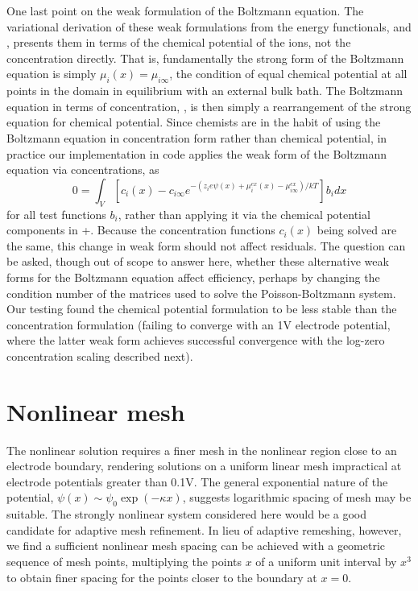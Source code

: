One last point on the weak formulation of the Boltzmann equation. The variational
derivation of these weak formulations from the energy functionals,
 and , presents them in terms of the
chemical potential of the ions, not the concentration directly. That
is, fundamentally the strong form of the Boltzmann equation is simply $\mu_i(x) =
\mu_{i\infty}$, the condition of equal chemical potential at all
points in the domain in equilibrium with an external bulk bath.
The Boltzmann
equation in terms of 
concentration, , is then simply a rearrangement of
the strong equation for chemical potential. Since chemists are in the
habit of using the Boltzmann equation in concentration form rather
than chemical potential, in practice our implementation in code applies the weak
form of the Boltzmann equation via concentrations, as
\begin{equation}
0 =   \int_V \left[ c_i(x) - c_{i\infty}
    e^{-\left(z_i e \psi(x) +
      \mu_i^{ex}(x)-\mu_{i\infty}^{ex}\right)/kT} \right] b_i
dx 
\label{weak_Boltzmann_conc}
\end{equation}
for all test functions $b_i$, rather than applying it via the chemical
potential components in 
+. Because the concentration functions $c_i(x)$ being
solved are the same, this change in weak form should not affect
residuals. The question can be asked, though out of scope
to answer here, whether these alternative weak forms for the Boltzmann
equation affect efficiency, perhaps by changing the condition number
of the matrices used to solve the Poisson-Boltzmann system. Our
testing found the chemical potential formulation to be less stable than the
concentration formulation (failing to converge with an 1V electrode
potential, where the latter weak form achieves successful convergence
with the log-zero concentration scaling described next).

\section{Nonlinear mesh}
The nonlinear solution requires a finer mesh in the nonlinear region
close to an electrode boundary, rendering solutions on a uniform linear mesh  impractical at electrode
potentials greater than 0.1V.  The general exponential nature of the potential,
$\psi(x) \sim \psi_{0} \exp(-\kappa x)$, suggests logarithmic spacing of
mesh may be suitable. The strongly nonlinear  system
considered here  would be a good candidate for adaptive mesh refinement. In
lieu of adaptive remeshing, however, we find a sufficient nonlinear
mesh spacing can be achieved with a geometric sequence of mesh points,
multiplying the points $x$ of a uniform unit interval by $x^3$ to
obtain finer spacing for the points closer to the boundary at $x=0$.

